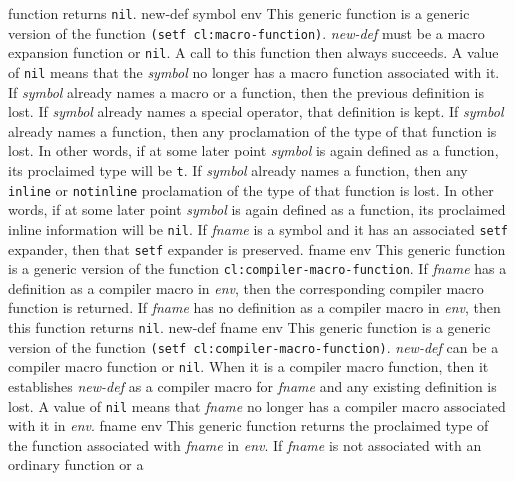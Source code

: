 function returns \texttt{nil}.
\vskip -0.02cm
\vskip -0.02cm
 {new-def symbol env}
\vskip -0.2cm
This generic function is a generic version of the \commonlisp{}
function \texttt{(setf cl:macro-function)}.
\vskip -0.02cm
\textit{new-def} must be a macro expansion function or \texttt{nil}.
A call to this function then always succeeds.  A value of \texttt{nil}
means that the \textit{symbol} no longer has a macro function
associated with it.  If \textit{symbol} already names a macro or a
function, then the previous definition is lost.  If \textit{symbol}
already names a special operator, that definition is kept.
\vskip -0.02cm
If \textit{symbol} already names a function, then any proclamation of
the type of that function is lost.  In other words, if at some later
point \textit{symbol} is again defined as a function, its proclaimed
type will be \texttt{t}.
\vskip -0.02cm
If \textit{symbol} already names a function, then any \texttt{inline} or
\texttt{notinline} proclamation of the type of that function is lost.  In other
words, if at some later point \textit{symbol} is again defined as a
function, its proclaimed inline information will be \texttt{nil}.
\vskip -0.02cm
If \textit{fname} is a symbol and it has an associated \texttt{setf}
expander, then that \texttt{setf} expander is preserved.
\vskip -0.02cm
 {fname env}
\vskip -0.2cm
This generic function is a generic version of the \commonlisp{}
function \texttt{cl:compiler-macro-function}.
\vskip -0.02cm
If \textit{fname} has a definition as a compiler macro in
\textit{env}, then the corresponding compiler macro function is
returned.
\vskip -0.02cm
If \textit{fname} has no definition as a compiler macro in
\textit{env}, then this function returns \texttt{nil}.
\vskip -0.02cm
 {new-def fname env}
\vskip -0.2cm
This generic function is a generic version of the \commonlisp{}
function \texttt{(setf cl:compiler-macro-function)}.
\vskip -0.02cm
\textit{new-def} can be a compiler macro function or \texttt{nil}.
When it is a compiler macro function, then it establishes
\textit{new-def} as a compiler macro for \textit{fname} and any
existing definition is lost.  A value of \texttt{nil} means that
\textit{fname} no longer has a compiler macro associated with it in
\textit{env}.
\vskip -0.02cm
 {fname env}
\vskip -0.2cm
This generic function returns the proclaimed type of the function
associated with \textit{fname} in \textit{env}.
\vskip -0.02cm
If \textit{fname} is not associated with an ordinary function or a
